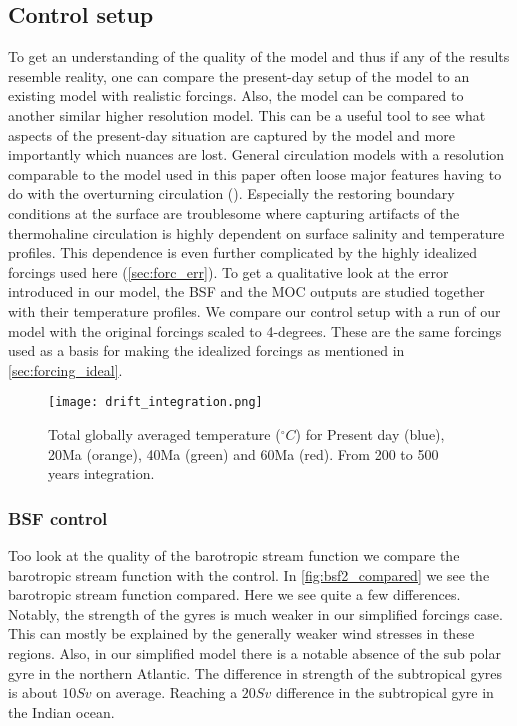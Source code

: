 \subsection{Control setup}


To get an understanding of the quality of the model and thus if any of the results resemble reality, one can compare the present-day setup of the model to an existing model with realistic forcings. Also, the model can be compared to another similar higher resolution model. This can be a useful tool to see what aspects of the present-day situation are captured by the model and more importantly which nuances are lost. General circulation models with a resolution comparable to the model used in this paper often loose major features having to do with the overturning circulation (\cite{stone1990limitations}). Especially the restoring boundary conditions at the surface are troublesome where capturing artifacts of the thermohaline circulation is highly dependent on surface salinity and temperature profiles. This dependence is even further complicated by the highly idealized forcings used here (\cref{sec:forc_err}). To get a qualitative look at the error introduced in our model, the BSF and the MOC outputs are studied together with their temperature profiles. We compare our control setup with a run of our model with the original \cite{ECMWFForc} forcings scaled to 4-degrees. These are the same forcings used as a basis for making the idealized forcings as mentioned in \cref{sec:forcing_ideal}.
\begin{figure}[H]
	\texttt{[image: drift\_integration.png]}
	\caption{Total globally averaged temperature ($^{\circ}C$) for Present day (blue), 20Ma (orange), 40Ma (green) and 60Ma (red). From 200 to 500 years integration.}
	\label{fig:avtempgrph}
\end{figure}
\subsubsection{BSF control}
Too look at the quality of the barotropic stream function we compare the barotropic stream function with the control. In \cref{fig:bsf2_compared} we see the barotropic stream function compared. Here we see quite a few differences. Notably, the strength of the gyres is much weaker in our simplified forcings case. This can mostly be explained by the generally weaker wind stresses in these regions. Also, in our simplified model there is a notable absence of the sub polar gyre in the northern Atlantic. The difference in strength of the subtropical gyres is about $10Sv$ on average. Reaching a $20 Sv$ difference in the subtropical gyre in the Indian ocean. 


